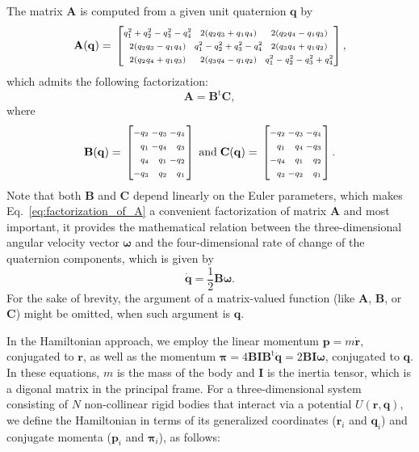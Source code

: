\documentclass[aip,jcp,reprint,amsmath,amssymb]{revtex4-1}
\makeatletter
\newcommand{\mt}[1]{\boldsymbol{\mathbf{#1}}}           %
\newcommand{\vt}[1]{\boldsymbol{\mathbf{#1}}}           %
\newcommand{\tr}[1]{#1^\text{t}}                        %
\newenvironment{smallarray}[1]                          %
{\null\,\vcenter\bgroup\scriptsize
	\renewcommand{\arraystretch}{1.5}
	\arraycolsep=.13885em
	\hbox\bgroup$\left[\array{@{}#1@{}}}
{\endarray\right]$\egroup\egroup\,\null}
\makeatother
\begin{document}
The matrix $\mt A$ is computed from a given unit quaternion $\vt q$ by\cite{Allen1989,Miller2002}
\begin{equation*}
\label{eq:A_from_q}
\mt A(\vt q) = \begin{smallarray}{ccc}
q_1^2 + q_2^2 - q_3^2 - q_4^2 & 2(q_2 q_3 + q_1 q_4) & 2(q_2 q_4 - q_1 q_3) \\
2(q_2 q_3 - q_1 q_4) & q_1^2 - q_2^2 + q_3^2 - q_4^2 & 2(q_3 q_4 + q_1 q_2) \\
2(q_2 q_4 + q_1 q_3) & 2(q_3 q_4 - q_1 q_2) & q_1^2 - q_2^2 - q_3^2 + q_4^2  
\end{smallarray},
\end{equation*}
which admits the following factorization:
\begin{equation}
\label{eq:factorization_of_A}
{\mt A} = \tr{\mt B}{\mt C},
\end{equation} 
where
\begin{equation}
\label{eq:def_B_and_C}
\mt B(\vt q) = \begin{smallarray}{rrrr}
-q_2 & -q_3 & -q_4 \\
 q_1 & -q_4 &  q_3 \\
 q_4 &  q_1 & -q_2 \\
-q_3 &  q_2 &  q_1
\end{smallarray}
\; \text{and} \;
\mt C(\vt q) = \begin{smallarray}{rrrr}
-q_2 & -q_3 & -q_4 \\
 q_1 &  q_4 & -q_3 \\
-q_4 &  q_1 &  q_2 \\
 q_3 & -q_2 &  q_1
\end{smallarray}.
\end{equation}
Note that both $\mt B$ and $\mt C$ depend linearly on the Euler parameters, which makes Eq.~\eqref{eq:factorization_of_A} a convenient factorization of matrix $\mt A$ and most important, it provides the mathematical relation between the three-dimensional angular velocity vector $\vt \omega$ and the four-dimensional rate of change of the quaternion components, which is given by
\begin{equation}
\label{eq:relation_qdot_omega}
\dot{\vt q} = \frac{1}{2} \mt B \vt \omega.
\end{equation}
 For the sake of brevity, the argument of a matrix-valued function (like $\mt A$, $\vt B$, or $\mt C$) might be omitted, when such argument is $\vt q$.

In the Hamiltonian approach, we employ the linear momentum $\vt p = m \dot{\vt r}$, conjugated to $\vt r$, as well as the momentum $\vt \pi= 4 \mt B \mt I \tr{\mt B} \dot{\vt q} = 2 \mt B \mt I \vt \omega$, conjugated to $\vt q$\cite{Goldstein2002}. In these equations, $m$ is the mass of the body and $\mt I$ is the inertia tensor, which is a digonal matrix in the principal frame. For a three-dimensional system consisting of $N$ non-collinear rigid bodies that interact via a potential $U(\vt r, \vt q)$, we define the Hamiltonian in terms of its generalized coordinates ($\vt r_i$ and $\vt q_i$) and conjugate momenta ($\vt p_i$ and $\vt \pi_i$), as follows:~\cite{Abreu_2017}
\end{document}
